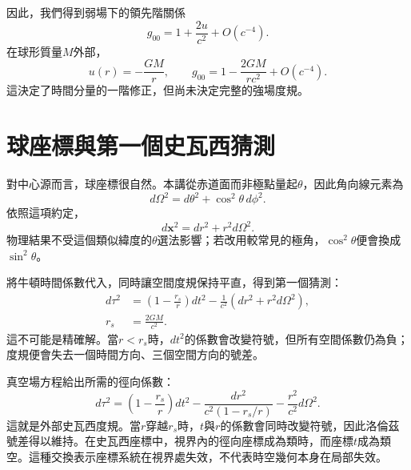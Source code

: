 因此，我們得到弱場下的領先階關係
\begin{equation}
g_{00}=1+\frac{2u}{c^2}+O(c^{-4}).
\label{eq:l5-g00-newton}
\end{equation}
在球形質量\(M\)外部，
\begin{equation}
u(r)=-\frac{GM}{r},
\qquad
g_{00}=1-\frac{2GM}{rc^2}+O(c^{-4}).
\label{eq:l5-g00-spherical}
\end{equation}
這決定了時間分量的一階修正，但尚未決定完整的強場度規。

\section{球座標與第一個史瓦西猜測}

對中心源而言，球座標很自然。本講從赤道面而非極點量起\(\theta\)，因此角向線元素為
\begin{equation}
d\Omega^2=d\theta^2+\cos^2\theta\,d\phi^2.
\label{eq:l5-angular-metric}
\end{equation}
依照這項約定，
\begin{equation}
d\mathbf{x}^2=dr^2+r^2d\Omega^2.
\label{eq:l5-flat-spherical}
\end{equation}
物理結果不受這個類似緯度的\(\theta\)選法影響；若改用較常見的極角，\(\cos^2\theta\)便會換成\(\sin^2\theta\)。

將牛頓時間係數代入，同時讓空間度規保持平直，得到第一個猜測：
\begin{equation}
\begin{aligned}
d\tau^2
&=\left(1-\frac{r_s}{r}\right)dt^2
-\frac{1}{c^2}\left(dr^2+r^2d\Omega^2\right),\\
r_s&=\frac{2GM}{c^2}.
\end{aligned}
\label{eq:l5-naive-schwarzschild}
\end{equation}
這不可能是精確解。當\(r<r_s\)時，\(dt^2\)的係數會改變符號，但所有空間係數仍為負；度規便會失去一個時間方向、三個空間方向的號差。

真空場方程給出所需的徑向係數：
\begin{equation}
\boxed{
d\tau^2
=\left(1-\frac{r_s}{r}\right)dt^2
-\frac{dr^2}{c^2\left(1-r_s/r\right)}
-\frac{r^2}{c^2}d\Omega^2.
}
\label{eq:l5-schwarzschild}
\end{equation}
這就是外部史瓦西度規。當\(r\)穿越\(r_s\)時，\(t\)與\(r\)的係數會同時改變符號，因此洛倫茲號差得以維持。在史瓦西座標中，視界內的徑向座標成為類時，而座標\(t\)成為類空。這種交換表示座標系統在視界處失效，不代表時空幾何本身在局部失效。

\begin{classroomqa}
\end{classroomqa}

